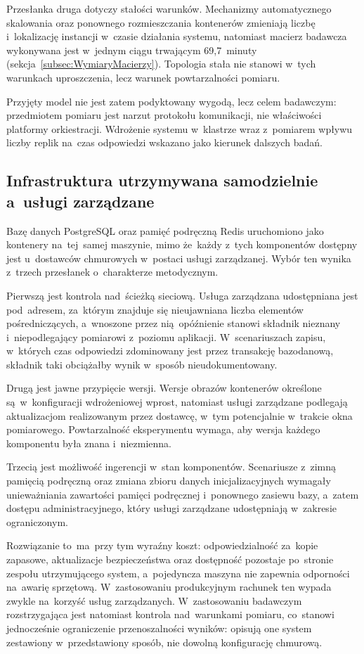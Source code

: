 Przesłanka druga dotyczy stałości warunków. Mechanizmy automatycznego skalowania oraz ponownego rozmieszczania kontenerów zmieniają liczbę i~lokalizację instancji w~czasie działania systemu, natomiast macierz badawcza wykonywana jest w~jednym ciągu trwającym 69,7~minuty (sekcja~\ref{subsec:WymiaryMacierzy}). Topologia stała nie stanowi w~tych warunkach uproszczenia, lecz warunek powtarzalności pomiaru.

Przyjęty model nie jest zatem podyktowany wygodą, lecz celem badawczym: przedmiotem pomiaru jest narzut protokołu komunikacji, nie właściwości platformy orkiestracji. Wdrożenie systemu w~klastrze wraz z~pomiarem wpływu liczby replik na~czas odpowiedzi wskazano jako kierunek dalszych badań.

\subsection{Infrastruktura utrzymywana samodzielnie a~usługi zarządzane}
\label{subsec:SelfHosted}

Bazę danych PostgreSQL oraz pamięć podręczną Redis uruchomiono jako kontenery na~tej~samej maszynie, mimo że~każdy z~tych komponentów dostępny jest u~dostawców chmurowych w~postaci usługi zarządzanej. Wybór ten wynika z~trzech przesłanek o~charakterze metodycznym.

Pierwszą jest kontrola nad~ścieżką sieciową. Usługa zarządzana udostępniana jest pod~adresem, za~którym znajduje się nieujawniana liczba elementów pośredniczących, a~wnoszone przez nią~opóźnienie stanowi składnik nieznany i~niepodlegający pomiarowi z~poziomu aplikacji. W~scenariuszach zapisu, w~których czas odpowiedzi zdominowany jest przez transakcję bazodanową, składnik taki obciążałby wynik w~sposób nieudokumentowany.

Drugą jest jawne przypięcie wersji. Wersje obrazów kontenerów określone są~w~konfiguracji wdrożeniowej wprost, natomiast usługi zarządzane podlegają aktualizacjom realizowanym przez dostawcę, w~tym potencjalnie w~trakcie okna pomiarowego. Powtarzalność eksperymentu wymaga, aby wersja każdego komponentu była znana i~niezmienna.

Trzecią jest możliwość ingerencji w~stan komponentów. Scenariusze z~zimną pamięcią podręczną oraz zmiana zbioru danych inicjalizacyjnych wymagały unieważniania zawartości pamięci podręcznej i~ponownego zasiewu bazy, a~zatem dostępu administracyjnego, który usługi zarządzane udostępniają w~zakresie ograniczonym.

Rozwiązanie to~ma~przy tym wyraźny koszt: odpowiedzialność za~kopie zapasowe, aktualizacje bezpieczeństwa oraz dostępność pozostaje po~stronie zespołu utrzymującego system, a~pojedyncza maszyna nie zapewnia odporności na~awarię sprzętową. W~zastosowaniu produkcyjnym rachunek ten wypada zwykle na~korzyść usług zarządzanych. W~zastosowaniu badawczym rozstrzygająca jest natomiast kontrola nad~warunkami pomiaru, co~stanowi jednocześnie ograniczenie przenoszalności wyników: opisują one system zestawiony w~przedstawiony sposób, nie dowolną konfigurację chmurową.

